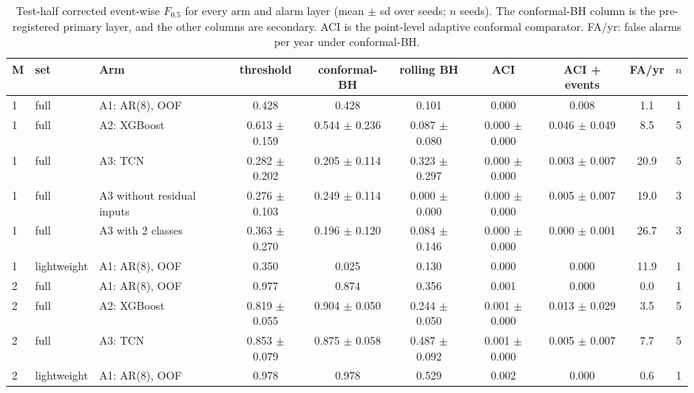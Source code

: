 \begin{table}[t]\centering\scriptsize
\caption{Test-half corrected event-wise $F_{0.5}$ for every arm and alarm layer (mean $\pm$ sd over seeds; $n$ seeds). The conformal-BH column is the pre-registered primary layer, and the other columns are secondary. ACI is the point-level adaptive conformal comparator. FA/yr: false alarms per year under conformal-BH.}\label{tab:ablations}
\begin{tabular}{lllccccccc}\toprule
M & set & Arm & threshold & conformal-BH & rolling BH & ACI & ACI + events & FA/yr & $n$\\\midrule
1 & full & A1: AR(8), OOF & 0.428 & 0.428 & 0.101 & 0.000 & 0.008 & 1.1 & 1\\
1 & full & A2: XGBoost & 0.613 $\pm$ 0.159 & 0.544 $\pm$ 0.236 & 0.087 $\pm$ 0.080 & 0.000 $\pm$ 0.000 & 0.046 $\pm$ 0.049 & 8.5 & 5\\
1 & full & A3: TCN & 0.282 $\pm$ 0.202 & 0.205 $\pm$ 0.114 & 0.323 $\pm$ 0.297 & 0.000 $\pm$ 0.000 & 0.003 $\pm$ 0.007 & 20.9 & 5\\
1 & full & A3 without residual inputs & 0.276 $\pm$ 0.103 & 0.249 $\pm$ 0.114 & 0.000 $\pm$ 0.000 & 0.000 $\pm$ 0.000 & 0.005 $\pm$ 0.007 & 19.0 & 3\\
1 & full & A3 with 2 classes & 0.363 $\pm$ 0.270 & 0.196 $\pm$ 0.120 & 0.084 $\pm$ 0.146 & 0.000 $\pm$ 0.000 & 0.000 $\pm$ 0.001 & 26.7 & 3\\
1 & lightweight & A1: AR(8), OOF & 0.350 & 0.025 & 0.130 & 0.000 & 0.000 & 11.9 & 1\\
2 & full & A1: AR(8), OOF & 0.977 & 0.874 & 0.356 & 0.001 & 0.000 & 0.0 & 1\\
2 & full & A2: XGBoost & 0.819 $\pm$ 0.055 & 0.904 $\pm$ 0.050 & 0.244 $\pm$ 0.050 & 0.001 $\pm$ 0.000 & 0.013 $\pm$ 0.029 & 3.5 & 5\\
2 & full & A3: TCN & 0.853 $\pm$ 0.079 & 0.875 $\pm$ 0.058 & 0.487 $\pm$ 0.092 & 0.001 $\pm$ 0.000 & 0.005 $\pm$ 0.007 & 7.7 & 5\\
2 & lightweight & A1: AR(8), OOF & 0.978 & 0.978 & 0.529 & 0.002 & 0.000 & 0.6 & 1\\
\bottomrule\end{tabular}\end{table}
